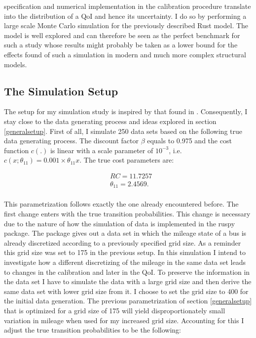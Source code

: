 specification and numerical implementation in the calibration procedure translate into the distribution of a QoI and hence its uncertainty. I do so by performing a large scale Monte Carlo simulation for the previously described Rust model. The model is well explored and can therefore be seen as the perfect benchmark for such a study whose results might probably be taken as a lower bound for the effects found of such a simulation in modern and much more complex structural models.

\subsection{The Simulation Setup}

The setup for my simulation study is inspired by that found in \cite{Iskhakov.2016}. Consequently, I stay close to the data generating process and ideas explored in section \ref{generalsetup}. First of all, I simulate 250 data sets based on the following true data generating process. The discount factor $\beta$ equals to 0.975 and the cost function $c(.)$ is linear with a scale parameter of $10^{-3}$, i.e. $c(x; \theta_{11}) = 0.001 \times \theta_{11} x$. The true cost parameters are:

\begin{equation*}
\begin{split}
& RC = 11.7257 \\
& \theta_{11} = 2.4569 . \\
\end{split}
\end{equation*}

This parametrization follows exactly the one already encountered before. The first change enters with the true transition probabilities. This change is necessary due to the nature of how the simulation of data is implemented in the ruspy package. The package gives out a data set in which the mileage state of a bus is already discretized according to a previously specified grid size. As a reminder this grid size was set to 175 in the previous setup. In this simulation I intend to investigate how a different discretizing of the mileage in the same data set leads to changes in the calibration and later in the QoI. To preserve the information in the data set I have to simulate the data with a large grid size and then derive the same data set with lower grid size from it. I choose to set the grid size to 400 for the initial data generation. The previous parametrization of section \ref{generalsetup} that is optimized for a grid size of 175 will yield disproportionately small variation in mileage when used for my increased grid size. Accounting for this I adjust the true transition probabilities to be the following:

